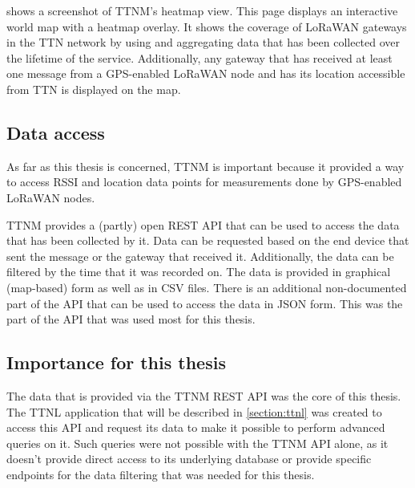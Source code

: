  shows a screenshot of \acl{TTNM}'s heatmap view.
This page displays an interactive world map with a heatmap overlay.
It shows the coverage of \ac{LoRaWAN} gateways in the \ac{TTN} network by using and aggregating data that has been collected over the lifetime of the service.
Additionally, any gateway that has received at least one message from a \ac{GPS}-enabled \ac{LoRaWAN} node and has its location accessible from \ac{TTN} is displayed on the map.

\subsection{Data access}

As far as this thesis is concerned, \acl{TTNM} is important because it provided a way to access \ac{RSSI} and location data points for measurements done by \ac{GPS}-enabled \ac{LoRaWAN} nodes.

\ac{TTNM} provides a (partly) open \ac{REST} \ac{API} that can be used to access the data that has been collected by it.
Data can be requested based on the end device that sent the message or the gateway that received it.
Additionally, the data can be filtered by the time that it was recorded on.
The data is provided in graphical (map-based) form as well as in \ac{CSV} files.
There is an additional non-documented part of the \ac{API} that can be used to access the data in \ac{JSON} form.
This was the part of the \ac{API} that was used most for this thesis.

\subsection{Importance for this thesis}

The data that is provided via the \ac{TTNM} \ac{REST} \ac{API} was the core of this thesis.
The \ac{TTNL} application that will be described in \cref{section:ttnl} was created to access this \ac{API} and request its data to make it possible to perform advanced queries on it.
Such queries were not possible with the \ac{TTNM} \ac{API} alone, as it doesn't provide direct access to its underlying database or provide specific endpoints for the data filtering that was needed for this thesis.